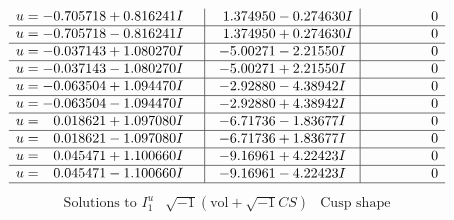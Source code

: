 \documentclass[1p]{elsarticle_modified}
\theoremstyle{definition}
\newcommand{\I}{\sqrt{-1}}
\begin{document}
$$\begin{array}{c|c|c}
\begin{aligned}
u &= -0.705718 + 0.816241 I\end{aligned}
 & \phantom{-}1.374950 - 0.274630 I & \phantom{-0.000000 } 0 \\ \hline\begin{aligned}
u &= -0.705718 - 0.816241 I\end{aligned}
 & \phantom{-}1.374950 + 0.274630 I & \phantom{-0.000000 } 0 \\ \hline\begin{aligned}
u &= -0.037143 + 1.080270 I\end{aligned}
 & -5.00271 - 2.21550 I & \phantom{-0.000000 } 0 \\ \hline\begin{aligned}
u &= -0.037143 - 1.080270 I\end{aligned}
 & -5.00271 + 2.21550 I & \phantom{-0.000000 } 0 \\ \hline\begin{aligned}
u &= -0.063504 + 1.094470 I\end{aligned}
 & -2.92880 - 4.38942 I & \phantom{-0.000000 } 0 \\ \hline\begin{aligned}
u &= -0.063504 - 1.094470 I\end{aligned}
 & -2.92880 + 4.38942 I & \phantom{-0.000000 } 0 \\ \hline\begin{aligned}
u &= \phantom{-}0.018621 + 1.097080 I\end{aligned}
 & -6.71736 - 1.83677 I & \phantom{-0.000000 } 0 \\ \hline\begin{aligned}
u &= \phantom{-}0.018621 - 1.097080 I\end{aligned}
 & -6.71736 + 1.83677 I & \phantom{-0.000000 } 0 \\ \hline\begin{aligned}
u &= \phantom{-}0.045471 + 1.100660 I\end{aligned}
 & -9.16961 + 4.22423 I & \phantom{-0.000000 } 0 \\ \hline\begin{aligned}
u &= \phantom{-}0.045471 - 1.100660 I\end{aligned}
 & -9.16961 - 4.22423 I & \phantom{-0.000000 } 0\\
 \hline 
 \end{array}$$\newpage$$\begin{array}{c|c|c}  
\text{Solutions to }I^u_{1}& \I (\text{vol} + \sqrt{-1}CS) & \text{Cusp shape}\\

\end{array}$$
\end{document}
